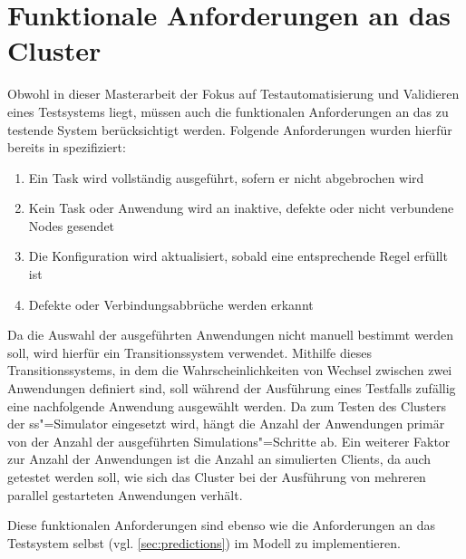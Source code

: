 \section{Funktionale Anforderungen an das Cluster}
\label{sec:clusterRequirements}

Obwohl in dieser Masterarbeit der Fokus auf Testautomatisierung und Validieren eines Testsystems liegt, müssen auch die funktionalen Anforderungen an das zu testende System berücksichtigt werden.
Folgende Anforderungen wurden hierfür bereits in \cite{Eberhardinger2018} spezifiziert:

\begin{enumerate}
    \item Ein Task wird vollständig ausgeführt, sofern er nicht abgebrochen wird
    \item Kein Task oder Anwendung wird an inaktive, defekte oder nicht verbundene Nodes gesendet
    \item Die Konfiguration wird aktualisiert, sobald eine entsprechende Regel erfüllt ist
    \item Defekte oder Verbindungsabbrüche werden erkannt
\end{enumerate}


Da die Auswahl der ausgeführten Anwendungen nicht manuell bestimmt werden soll, wird hierfür ein Transitionssystem verwendet.
Mithilfe dieses Transitionssystems, in dem die Wahrscheinlichkeiten von Wechsel zwischen zwei Anwendungen definiert sind, soll während der Ausführung eines Testfalls zufällig eine nachfolgende Anwendung ausgewählt werden.
Da zum Testen des Clusters der \ac{ss}"=Simulator eingesetzt wird, hängt die Anzahl der Anwendungen primär von der Anzahl der ausgeführten Simulations"=Schritte ab.
Ein weiterer Faktor zur Anzahl der Anwendungen ist die Anzahl an simulierten Clients, da auch getestet werden soll, wie sich das Cluster bei der Ausführung von mehreren parallel gestarteten Anwendungen verhält.

Diese funktionalen Anforderungen sind ebenso wie die Anforderungen an das Testsystem selbst (vgl. \autoref{sec:predictions}) im Modell zu implementieren.
